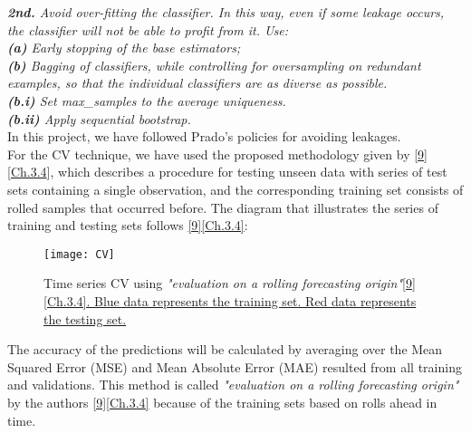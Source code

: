 \noindent \textit{\textbf{2nd.} Avoid over-fitting the classifier. In this way, even if some leakage occurs, the classifier will not be able to profit from it. Use:}\\

\qquad \textit{\textbf{(a)} Early stopping of the base estimators;}\\

\qquad \textit{\textbf{(b)} Bagging of classifiers, while controlling for oversampling on redundant examples, so that the individual classifiers are as diverse as possible.}\\

\qquad \qquad \textit{\textbf{(b.i)} Set max\_samples to the average uniqueness.}\\

\qquad \qquad \textit{\textbf{(b.ii)} Apply sequential bootstrap.}\\

In this project, we have followed Prado's policies for avoiding leakages.\\

For the CV technique, we have used the proposed methodology given by \hyperref[Bib:Hyndman, R.J., and Athanasopoulos, G.]{[9]}[\href{https://otexts.com/fpp2/}{Ch.3.4}], which describes a procedure for testing unseen data with series of test sets containing a single observation, and the corresponding training set consists of rolled samples that occurred before. The diagram that illustrates the series of training and testing sets follows \hyperref[Bib:Hyndman, R.J., and Athanasopoulos, G.]{[9][Ch.3.4]}:

\begin{figure}[H]
\label{fig:CV}
\centering
\texttt{[image: CV]}
\caption{Time series CV using \textit{"evaluation on a rolling forecasting origin"}\hyperref[Bib:Hyndman, R.J., and Athanasopoulos, G.]{[9][Ch.3.4]. Blue data represents the training set. Red data represents the testing set.}}
\end{figure}

The accuracy of the predictions will be calculated by averaging over the Mean Squared Error (MSE) and Mean Absolute Error (MAE) resulted from all training and validations. This method is called \textit{"evaluation on a rolling forecasting origin"} by the authors \hyperref[Bib:Hyndman, R.J., and Athanasopoulos, G.]{[9][Ch.3.4]} because of the training sets based on rolls ahead in time.\\

